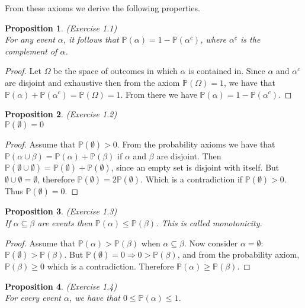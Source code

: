 \documentclass{amsart}
\theoremstyle{plain}
\newtheorem{proposition}{Proposition}
\newcommand{\pr}{\mathbb{P}}
\begin{document}
From these axioms we derive the following properties.

\begin{proposition} (Exercise 1.1)\\
  For any event $\alpha$, it follows that $\pr(\alpha)=1-\pr(\alpha^c)$, where $\alpha^c$ is
  the complement of $\alpha$.
\end{proposition}

\begin{proof}
  Let $\Omega$ be the space of outcomes in which $\alpha$ is contained in. Since $\alpha$ and
  $\alpha^c$ are disjoint and exhaustive then from the axiom $\pr(\Omega)=1$, we have that
  $\pr(\alpha)+\pr(\alpha^c)=\pr(\Omega)=1$. From there we have $\pr(\alpha)=1-\pr(\alpha^c)$.
\end{proof}

\begin{proposition} (Exercise 1.2)\\
  $\pr(\emptyset)=0$
\end{proposition}

\begin{proof}
  Assume that $\pr(\emptyset)>0$. From the probability axioms we have that $\pr(\alpha\cup\beta)=
  \pr(\alpha)+\pr(\beta)$ if $\alpha$ and $\beta$ are disjoint. Then $\pr(\emptyset\cup\emptyset)=
  \pr(\emptyset)+\pr(\emptyset)$, since an empty set is disjoint with itself. But $\emptyset\cup
  \emptyset=\emptyset$, therefore $\pr(\emptyset)=2\pr(\emptyset)$. Which is a contradiction if
  $\pr(\emptyset)>0$. Thus $\pr(\emptyset)=0$.
\end{proof}

\begin{proposition} (Exercise 1.3)\\
  If $\alpha\subseteq\beta$ are events then $\pr(\alpha)\leq\pr(\beta)$. This is called
  monotonicity.
\end{proposition}

\begin{proof}
  Assume that $\pr(\alpha)>\pr(\beta)$ when $\alpha\subseteq\beta$. Now consider $\alpha=
  \emptyset$: $\pr(\emptyset)>\pr(\beta)$. But $\pr(\emptyset)=0\Rightarrow0>\pr(\beta)$, and from
  the probability axiom, $\pr(\beta)\geq0$ which is a contradiction. Therefore $\pr(\alpha)\geq
  \pr(\beta)$.
\end{proof}

\begin{proposition} (Exercise 1.4)\\
  For every event $\alpha$, we have that $0\leq\pr(\alpha)\leq1$.
\end{proposition}
\end{document}
